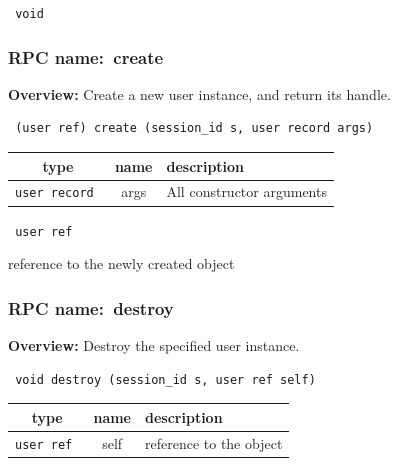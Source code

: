 \vspace{0.3cm}

{\tt 
void
}



\vspace{0.3cm}
\vspace{0.3cm}
\vspace{0.3cm}
\subsubsection{RPC name:~create}

{\bf Overview:} 
Create a new user instance, and return its handle.

\begin{verbatim} (user ref) create (session_id s, user record args)\end{verbatim}



 
\vspace{0.3cm}
\begin{tabular}{|c|c|p{7cm}|}
 \hline
{\bf type} & {\bf name} & {\bf description} \\ \hline
{\tt user record } & args & All constructor arguments \\ \hline 

\end{tabular}

\vspace{0.3cm}

{\tt 
user ref
}


reference to the newly created object
\vspace{0.3cm}
\vspace{0.3cm}
\vspace{0.3cm}
\subsubsection{RPC name:~destroy}

{\bf Overview:} 
Destroy the specified user instance.

\begin{verbatim} void destroy (session_id s, user ref self)\end{verbatim}



 
\vspace{0.3cm}
\begin{tabular}{|c|c|p{7cm}|}
 \hline
{\bf type} & {\bf name} & {\bf description} \\ \hline
{\tt user ref } & self & reference to the object \\ \hline 

\end{tabular}

